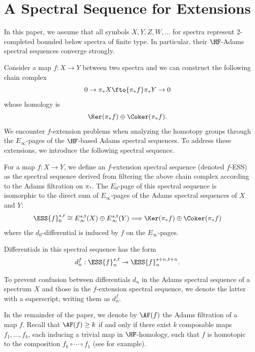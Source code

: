 \section{A Spectral Sequence for Extensions}\label{sec:ess}
In this paper, we assume that all symbols $X,Y,Z,W,\dots$ for spectra represent 2-completed bounded below spectra of finite type. In particular, their $\HF$-Adams spectral sequences converge strongly.

Consider a map $f: X\to Y$ between two spectra and we can construct the following chain complex
$$0\to \pi_*X\fto{\pi_*f} \pi_*Y\to 0$$
whose homology is 
$$\Ker(\pi_*f)\oplus \Coker(\pi_*f).$$
We encounter $f$-extension problems when analyzing the homotopy groups through the $E_\infty$-pages of the $\HF$-based Adams spectral sequences. To address these extensions, we introduce the following spectral sequence.



\begin{definition}\label{def:ess}
  For a map $f: X\to Y$, we define an $f$-extension spectral sequence (denoted $f$-ESS) as the spectral sequence derived from filtering the above chain complex according to the Adams filtration on $\pi_*$. The $E_0$-page of this spectral sequence is isomorphic to the direct sum of $E_\infty$-pages of the Adams spectral sequences of $X$ and $Y$: 
  $$\ESS{f}_0^{s,t} \cong E_\infty^{s,t}(X) \oplus E_\infty^{s,t}(Y) \Longrightarrow \Ker(\pi_*f)\oplus \Coker(\pi_*f)$$
  where the $d_0$-differential is induced by $f$ on the $E_\infty$-pages.
  
  Differentials in this spectral sequence has the form
  $$d_n^{f}: \ESS{f}_n^{s,t}\to \ESS{f}_n^{s+n, t+n}.$$
\end{definition}

To prevent confusion between differentials $d_n$ in the Adams spectral sequence of a spectrum $X$ and those in the $f$-extension spectral sequence, we denote the latter with a superscript, writing them as $d_n^{f}$. 

In the remainder of the paper, we denote by $\AF(f)$ the Adams filtration of a map $f$. Recall that $\AF(f) \ge k$ if and only if there exist $k$ composable maps $f_1, \ldots, f_k$, each inducing a trivial map in $\HF$-homology, such that $f$ is homotopic to the composition $f_k \circ \cdots \circ f_1$ (see \cite[Theorem~2.2.14]{RavenelGreenbook} for example).

